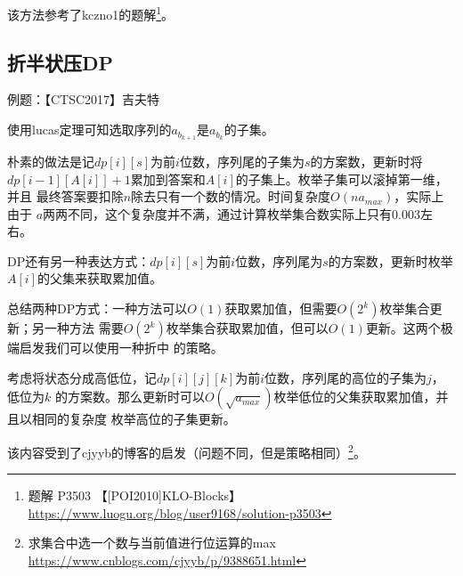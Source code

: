 该方法参考了kczno1的题解\footnote{
    题解 P3503 【[POI2010]KLO-Blocks】\\
    \url{https://www.luogu.org/blog/user9168/solution-p3503}
}。
\subsection{折半状压DP}
例题：【CTSC2017】吉夫特

使用lucas定理可知选取序列的$a_{b_{k+1}}$是$a_{b_k}$的子集。

朴素的做法是记$dp[i][s]$为前$i$位数，序列尾的子集为$s$的方案数，更新时将
$dp[i-1][A[i]]+1$累加到答案和$A[i]$的子集上。枚举子集可以滚掉第一维，并且
最终答案要扣除$n$除去只有一个数的情况。时间复杂度$O(na_{max})$，实际上由于
$a$两两不同，这个复杂度并不满，通过计算枚举集合数实际上只有$0.003$左右。

DP还有另一种表达方式：$dp[i][s]$为前$i$位数，序列尾为$s$的方案数，更新时枚举
$A[i]$的父集来获取累加值。

总结两种DP方式：一种方法可以$O(1)$获取累加值，但需要$O(2^k)$枚举集合更新；另一种方法
需要$O(2^k)$枚举集合获取累加值，但可以$O(1)$更新。这两个极端启发我们可以使用一种折中
的策略。

考虑将状态分成高低位，记$dp[i][j][k]$为前$i$位数，序列尾的高位的子集为$j$，低位为$k$
的方案数。那么更新时可以$O(\sqrt{a_{max}})$枚举低位的父集获取累加值，并且以相同的复杂度
枚举高位的子集更新。

该内容受到了cjyyb的博客的启发（问题不同，但是策略相同）\footnote{
    求集合中选一个数与当前值进行位运算的max\\
    \url{https://www.cnblogs.com/cjyyb/p/9388651.html}
}。
